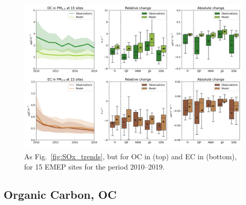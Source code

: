 \begin{figure}[t]
\includegraphics[width=16cm]{FIGS_TRENDS/ECOC_trends.png}
\caption{As Fig.~\ref{fig:SOx_trends}, but for OC in \pmfine (top) and EC in \pmfine (bottom), for 15 EMEP sites for the period 2010--2019.
\label{fig:KEX1}
}
\end{figure}





\subsection{Organic Carbon, OC}
\label{ss:trendsOC}
 
